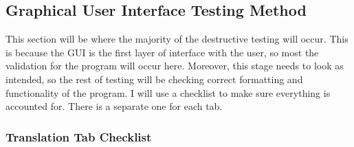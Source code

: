 \documentclass{report}
\begin{document}
\subsection{Graphical User Interface Testing Method}
This section will be where the majority of the destructive testing will occur. This is because the GUI is the first layer of interface with the user, so most the validation for the program will occur here. Moreover, this stage needs to look as intended, so the rest of testing will be checking correct formatting and functionality of the program. I will use a checklist to make sure everything is accounted for. There is a separate one for each tab.

\subsubsection{Translation Tab Checklist}
\end{document}
